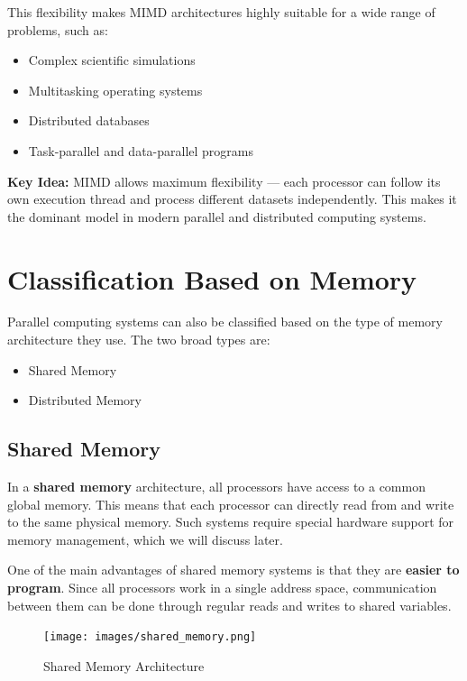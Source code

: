 \documentclass[12pt]{book}
\begin{document}
This flexibility makes MIMD architectures highly suitable for a wide range of problems, such as:
\begin{itemize}
    \item Complex scientific simulations
    \item Multitasking operating systems
    \item Distributed databases
    \item Task-parallel and data-parallel programs
\end{itemize}

\textbf{Key Idea:} MIMD allows maximum flexibility — each processor can follow its own execution thread and process different datasets independently. This makes it the dominant model in modern parallel and distributed computing systems.


\section{Classification Based on Memory}

Parallel computing systems can also be classified based on the type of memory architecture they use. The two broad types are:

\begin{itemize}
    \item Shared Memory
    \item Distributed Memory
\end{itemize}

\subsection{Shared Memory}

In a \textbf{shared memory} architecture, all processors have access to a common global memory. This means that each processor can directly read from and write to the same physical memory. Such systems require special hardware support for memory management, which we will discuss later.

One of the main advantages of shared memory systems is that they are \textbf{easier to program}. Since all processors work in a single address space, communication between them can be done through regular reads and writes to shared variables.

\begin{figure}[H]
    \centering
    \texttt{[image: images/shared\_memory.png]}
    \caption{Shared Memory Architecture}
    \label{fig:shared_memory}
\end{figure}
\end{document}
